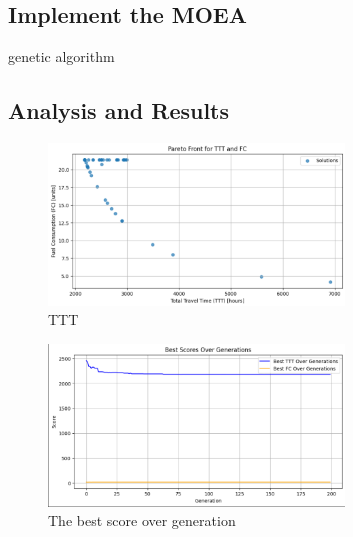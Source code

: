 \subsection{Implement the MOEA}
genetic algorithm
\subsection{Analysis and Results}

\begin{figure}[h]
    \centering
    \includegraphics[width=0.7\textwidth]{figures/TTT.PNG}
    \caption{TTT}
    \label{fig:Total Travel Time}
\end{figure}

\begin{figure}[h]
    \centering
    \includegraphics[width=0.7\textwidth]{figures/Best_score.PNG}
    \caption{The best score over generation}
    \label{fig:Best Score Over Generation} 
\end{figure}






